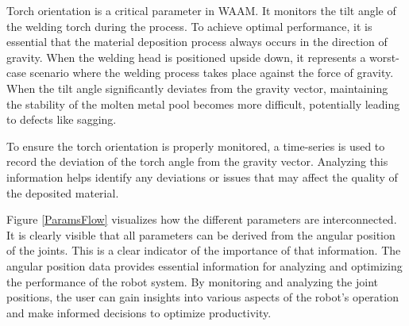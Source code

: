 


Torch orientation is a critical parameter in WAAM. It monitors the tilt angle of the welding torch during the process. To achieve optimal performance, it is essential that the material deposition process always occurs in the direction of gravity. When the welding head is positioned upside down, it represents a worst-case scenario where the welding process takes place against the force of gravity.
When the tilt angle significantly deviates from the gravity vector, maintaining the stability of the molten metal pool becomes more difficult, potentially leading to defects like sagging. 

To ensure the torch orientation is properly monitored, a time-series is used to record the deviation of the torch angle from the gravity vector. Analyzing this information helps identify any deviations or issues that may affect the quality of the deposited material. 






Figure \ref{ParamsFlow} visualizes how the different parameters are interconnected. It is clearly visible that all parameters can be derived from the angular position of the joints. This is a clear indicator of the importance of that information. The angular position data provides essential information for analyzing and optimizing the performance of the robot system. By monitoring and analyzing the joint positions, the user can gain insights into various aspects of the robot's operation and make informed decisions to optimize productivity.





